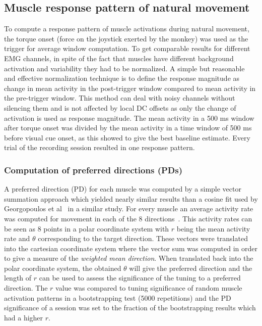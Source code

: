 % 
\subsection{Muscle response pattern of natural movement} %
\label{sg:sub:natural_movement}


To compute a response pattern of muscle activations during natural movement, the torque onset (force on the joystick exerted by the monkey) was used as the trigger for average window computation. To get comparable results for different EMG channels, in spite of the fact that muscles have different background activation and variability they had to be normalized. A simple but reasonable and effective normalization technique is to define the response magnitude as change in mean activity in the post-trigger window compared to mean activity in the pre-trigger window. This method can deal with noisy channels without silencing them and is not affected by local DC offsets as only the change of activation is used as response magnitude. The mean activity in a 500 ms window after torque onset was divided by the mean activity in a time window of 500 ms before visual cue onset, as this showed to give the best baseline estimate. Every trial of the recording session resulted in one response pattern.

\subsubsection{Computation of preferred directions (PDs)} %
\label{sg:ssub:pds}

A preferred direction (PD) for each muscle was computed by a simple vector summation approach which yielded nearly similar results than a cosine fit used by Georgopoulos et al~\citet{Georgopoulos:1982p4165} in a similar study. For every muscle an average activity rate was computed for movement in each of the 8 directions~. This activity rates can be seen as 8 points in a polar coordinate system with $r$ being the mean activity rate and $\theta$ corresponding to the target direction. These vectors were translated into the cartesian coordinate system where the vector sum was computed in order to give a measure of the \emph{weighted mean direction}. When translated back into the polar coordinate system, the obtained $\theta$ will give the preferred direction and the length of $r$ can be used to assess the significance of the tuning to a preferred direction. The $r$ value was compared to tuning significance of random muscle activation patterns in a bootstrapping test (5000 repetitions) and the PD significance of a session was set to the fraction of the bootstrapping results which had a higher $r$. 

